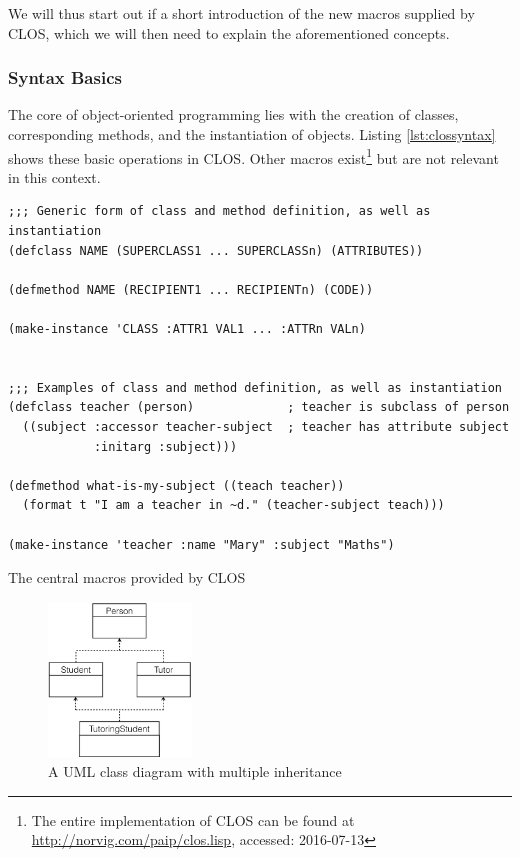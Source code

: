 \documentclass[oribibl]{llncs}
\begin{document}
We will thus start out if a short introduction of the new macros supplied by CLOS, which we will then need to explain the aforementioned concepts.


\subsubsection{Syntax Basics}
The core of object-oriented programming lies with the creation of classes, corresponding methods, and the instantiation of objects. Listing \ref{lst:clossyntax} shows these basic operations in CLOS. Other macros exist\footnote{The entire implementation of CLOS can be found at \url{http://norvig.com/paip/clos.lisp}, accessed: 2016-07-13} but are not relevant in this context.

\begin{listing}[]%
\begin{verbatim}
;;; Generic form of class and method definition, as well as instantiation
(defclass NAME (SUPERCLASS1 ... SUPERCLASSn) (ATTRIBUTES))

(defmethod NAME (RECIPIENT1 ... RECIPIENTn) (CODE))

(make-instance 'CLASS :ATTR1 VAL1 ... :ATTRn VALn)


;;; Examples of class and method definition, as well as instantiation
(defclass teacher (person)             ; teacher is subclass of person
  ((subject :accessor teacher-subject  ; teacher has attribute subject
            :initarg :subject)))

(defmethod what-is-my-subject ((teach teacher))       
  (format t "I am a teacher in ~d." (teacher-subject teach)))
  
(make-instance 'teacher :name "Mary" :subject "Maths")

\end{verbatim}
\caption{The central macros provided by CLOS}
\label{lst:clossyntax}
\end{listing}

\begin{figure}
  \begin{center}
    \includegraphics[width=0.34\textwidth]{images/multipleinheritance.png}
  \end{center}
  \caption{A UML class diagram with multiple inheritance}
  \label{fig:multipleinheritance}
\end{figure}
\end{document}
